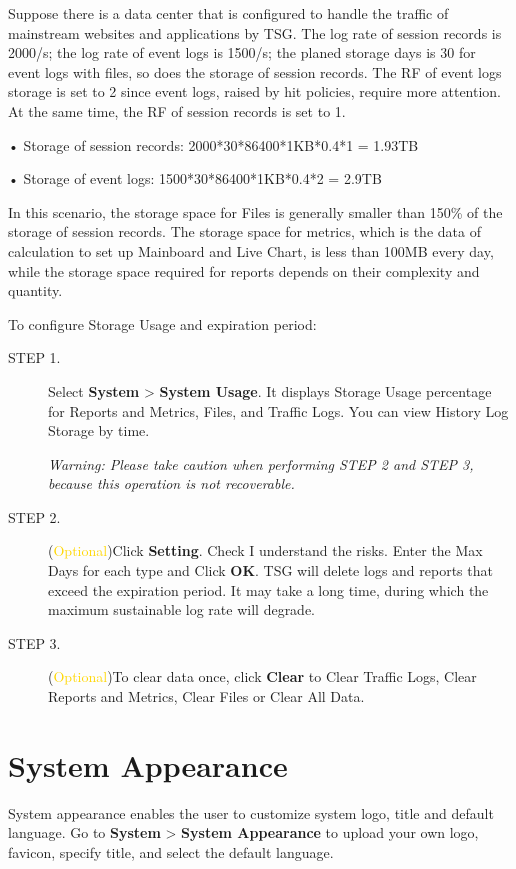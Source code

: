 Suppose there is a data center that is configured to handle the traffic of mainstream websites and applications by TSG. The log rate of session records is 2000/s; 
the log rate of event logs is 1500/s; the planed storage days is 30 for event logs with files, so does the storage of session records. 
The RF of event logs storage is set to 2 since event logs, raised by hit policies, require more attention. At the same time, the RF of session records is set to 1.


• Storage of session records: 2000*30*86400*1KB*0.4*1 = 1.93TB


• Storage of event logs: 1500*30*86400*1KB*0.4*2 = 2.9TB


In this scenario, the storage space for Files is generally smaller than 150\% of the storage of session records. 
The storage space for metrics, which is the data of calculation to set up Mainboard and Live Chart, 
is less than 100MB every day, while the storage space required for reports depends on their complexity and quantity.


To configure Storage Usage and expiration period:

\begin{description}
    \item[STEP 1.]	Select \textbf{System} > \textbf{System Usage}. It displays Storage Usage percentage for Reports and Metrics, Files, and Traffic Logs. 
    You can view History Log Storage by time.


\warnmark\textit{Warning: Please take caution when performing STEP 2 and STEP 3, because this operation is not recoverable.}
    \item[STEP 2.]	(\textcolor{gold}{Optional})Click \textbf{Setting}. Check \CheckedBox  I understand the risks. Enter the Max Days for each type and Click \textbf{OK}. TSG will delete logs and reports that exceed the expiration period. It may take a long time, during which the maximum sustainable log rate will degrade.
    \item[STEP 3.]	(\textcolor{gold}{Optional})To clear data once, click \textbf{Clear} to Clear Traffic Logs, Clear Reports and Metrics, Clear Files or Clear All Data.
\end{description} 

\section*{\hypertarget{link:System Appearance}{System Appearance}}
\label{sec:setting:appearance}

System appearance enables the user to customize system logo, title and default language. 
Go to \textbf{System} > \textbf{System Appearance} to upload your own logo, favicon, specify title, and select the default language.  